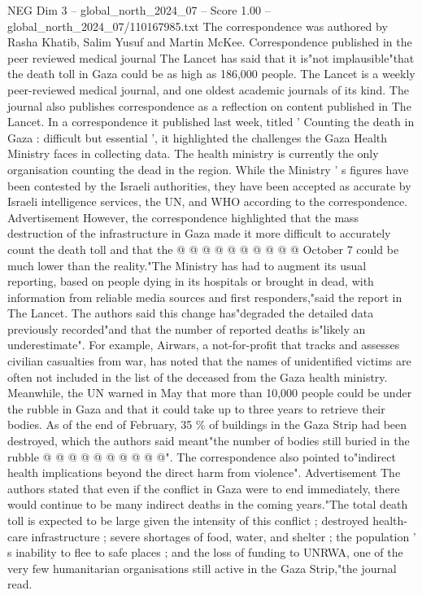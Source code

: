 \begin{textsample}{NEG Dim 3 – global\_north\_2024\_07 – Score 1.00 – global\_north\_2024\_07/110167985.txt}  \label{ex:f3_neg_375}
The correspondence was authored by Rasha Khatib, Salim Yusuf and Martin McKee.
Correspondence published in the peer reviewed medical journal The Lancet has said that it is"not implausible"that the death toll in Gaza could be as high as 186,000 people.
The Lancet is a weekly peer-reviewed medical journal, and one oldest academic journals of its kind.
The journal also publishes correspondence as a reflection on content published in The Lancet.
In a correspondence it published last week, titled ' Counting the death in Gaza : difficult but essential ', it highlighted the challenges the Gaza Health Ministry faces in collecting data.
The health ministry is currently the only organisation counting the dead in the region.
While the Ministry ' s figures have been contested by the Israeli authorities, they have been accepted as accurate by Israeli intelligence services, the UN, and WHO according to the correspondence.
Advertisement However, the correspondence highlighted that the mass destruction of the infrastructure in Gaza made it more difficult to accurately count the death toll and that the @ @ @ @ @ @ @ @ @ @ October 7 could be much lower than the reality."The Ministry has had to augment its usual reporting, based on people dying in its hospitals or brought in dead, with information from reliable media sources and first responders,"said the report in The Lancet.
The authors said this change has"degraded the detailed data previously recorded"and that the number of reported deaths is"likely an underestimate".
For example, Airwars, a not-for-profit that tracks and assesses civilian casualties from war, has noted that the names of unidentified victims are often not included in the list of the deceased from the Gaza health ministry.
Meanwhile, the UN warned in May that more than 10,000 people could be under the rubble in Gaza and that it could take up to three years to retrieve their bodies.
As of the end of February, 35 \% of buildings in the Gaza Strip had been destroyed, which the authors said meant"the number of bodies still buried in the rubble @ @ @ @ @ @ @ @ @ @".
The correspondence also pointed to"indirect health implications beyond the direct harm from violence".
Advertisement The authors stated that even if the conflict in Gaza were to end immediately, there would continue to be many indirect deaths in the coming years."The total death toll is expected to be large given the intensity of this conflict ; destroyed health-care infrastructure ; severe shortages of food, water, and shelter ; the population ' s inability to flee to safe places ; and the loss of funding to UNRWA, one of the very few humanitarian organisations still active in the Gaza Strip,"the journal read.

\end{textsample}
